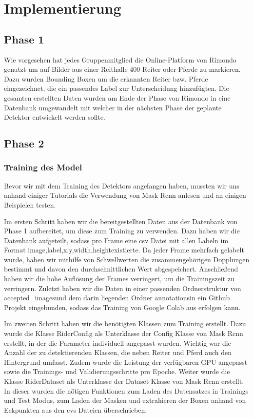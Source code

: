 \chapter{Implementierung}
\label{ch:implementierung}

\section{Phase 1}
Wie vorgesehen hat jedes Gruppenmitglied die Online-Platform von Rimondo genutzt um auf Bilder aus einer Reithalle 400 Reiter oder Pferde zu markieren. Dazu wurden Bounding Boxen um  die erkannten Reiter bzw. Pferde eingezeichnet, die ein passendes Label zur Unterscheidung hinzufügten. Die gesamten erstellten Daten wurden am Ende der Phase von Rimondo in eine Datenbank umgewandelt mit welcher in der nächsten Phase der geplante Detektor entwickelt werden sollte.

\section{Phase 2}
\subsection{Training des Model}
Bevor wir mit dem Training des Detektors angefangen haben, mussten wir uns anhand einiger Tutorials die Verwendung von Mask Rcnn anlesen und an einigen Beispielen testen. 


Im ersten Schritt haben wir die bereitgestellten Daten aus der Datenbank von Phase 1 aufbereitet, um diese zum Training zu verwenden. Dazu haben wir die Datenbank aufgeteilt, sodass pro Frame eine csv Datei mit allen Labeln im Format \dq image,label,x,y,width,height\dq existierte. Da jeder Frame mehrfach gelabelt wurde, haben wir mithilfe von Schwellwerten die zusammengehörigen Dopplungen bestimmt und davon den durchschnittlichen Wert abgespeichert. Anschließend haben wir die hohe Auflösung der Frames verringert, um die Trainingszeit zu verringern. Zuletzt haben wir die Daten in einer passenden Ordnerstruktur von \dq accepted_images\dq und dem darin liegenden Ordner \dq annotations\dq in ein Github Projekt eingebunden, sodass das Training von Google Colab aus erfolgen kann.

Im zweiten Schritt haben wir die benötigten Klassen zum Training erstellt. Dazu wurde die Klasse RiderConfig als Unterklasse der Config Klasse von Mask Rcnn erstellt, in der die Parameter individuell angepasst wurden. Wichtig war die Anzahl der zu detektierenden Klassen, die neben Reiter und Pferd auch den Hintergrund umfasst. Zudem wurde die Leistung der verfügbaren GPU angepasst sowie die Trainings- und Validierungsschritte pro Epoche. 
Weiter wurde die Klasse RiderDataset als Unterklasse der Dataset Klasse von Mask Rcnn erstellt. In dieser wurden die nötigen Funktionen zum Laden des Datensatzes in Trainings und Test Modus, zum Laden der Masken und extrahieren der Boxen anhand von Eckpunkten aus den cvs Dateien überschrieben.

